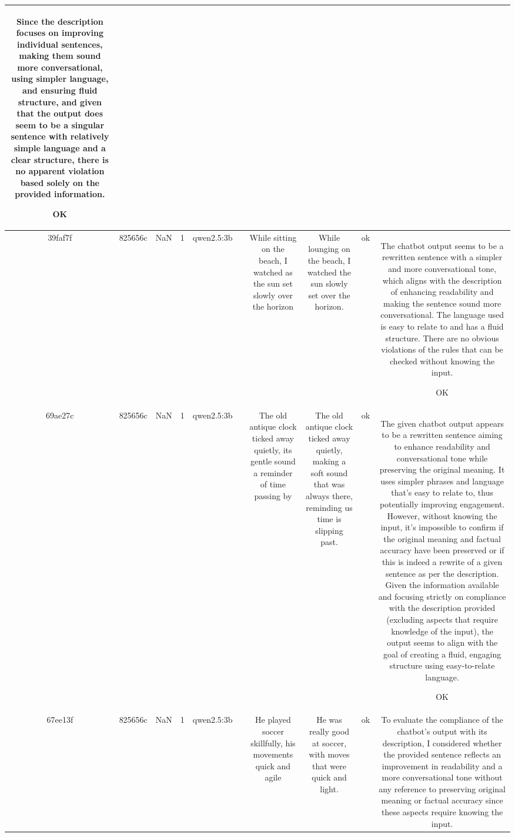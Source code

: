 \begin{table}[h!]
\begin{tabular}{|c|c|c|c|c|c|c|c|c|c|}
Since the description focuses on improving individual sentences, making them sound more conversational, using simpler language, and ensuring fluid structure, and given that the output does seem to be a singular sentence with relatively simple language and a clear structure, there is no apparent violation based solely on the provided information.

OK\\
\hline
39faf7f & 825656c & NaN & 1 & qwen2.5:3b &  & While sitting on the beach, I watched as the sun set slowly over the horizon & While lounging on the beach, I watched the sun slowly set over the horizon. & ok & The chatbot output seems to be a rewritten sentence with a simpler and more conversational tone, which aligns with the description of enhancing readability and making the sentence sound more conversational. The language used is easy to relate to and has a fluid structure. There are no obvious violations of the rules that can be checked without knowing the input.

OK\\
\hline
69ae27c & 825656c & NaN & 1 & qwen2.5:3b &  & The old antique clock ticked away quietly, its gentle sound a reminder of time passing by & The old antique clock ticked away quietly, making a soft sound that was always there, reminding us time is slipping past. & ok & The given chatbot output appears to be a rewritten sentence aiming to enhance readability and conversational tone while preserving the original meaning. It uses simpler phrases and language that's easy to relate to, thus potentially improving engagement. However, without knowing the input, it's impossible to confirm if the original meaning and factual accuracy have been preserved or if this is indeed a rewrite of a given sentence as per the description. Given the information available and focusing strictly on compliance with the description provided (excluding aspects that require knowledge of the input), the output seems to align with the goal of creating a fluid, engaging structure using easy-to-relate language.

OK\\
\hline
67ee13f & 825656c & NaN & 1 & qwen2.5:3b &  & He played soccer skillfully, his movements quick and agile & He was really good at soccer, with moves that were quick and light. & ok & To evaluate the compliance of the chatbot's output with its description, I considered whether the provided sentence reflects an improvement in readability and a more conversational tone without any reference to preserving original meaning or factual accuracy since these aspects require knowing the input.


\end{tabular}
\end{table}
